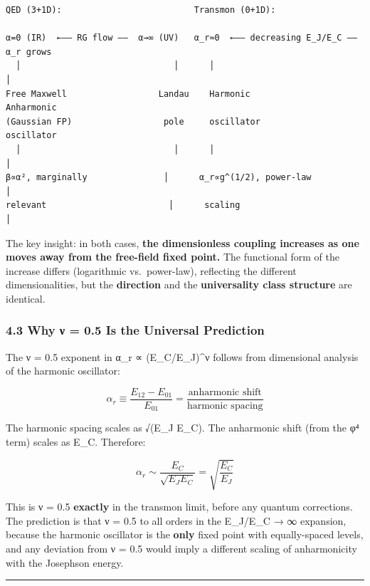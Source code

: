 \documentclass[
]{article}
\begin{document}
\begin{verbatim}
QED (3+1D):                          Transmon (0+1D):
                                     
α=0 (IR)  ←—— RG flow ——  α→∞ (UV)   α_r≈0  ←—— decreasing E_J/E_C ——  α_r grows
  │                              │      │                                    │
Free Maxwell                  Landau    Harmonic                        Anharmonic
(Gaussian FP)                  pole     oscillator                      oscillator
  │                              │      │                                    │
β∝α², marginally               │      α_r∝g^(1/2), power-law            │
relevant                        │      scaling                            │
\end{verbatim}

The key insight: in both cases, \textbf{the dimensionless coupling
increases as one moves away from the free-field fixed point.} The
functional form of the increase differs (logarithmic vs.~power-law),
reflecting the different dimensionalities, but the \textbf{direction}
and the \textbf{universality class structure} are identical.

\subsubsection{4.3 Why ν = 0.5 Is the Universal
Prediction}\label{why-ux3bd-0.5-is-the-universal-prediction}

The ν = 0.5 exponent in α\_r ∝ (E\_C/E\_J)\^{}ν follows from dimensional
analysis of the harmonic oscillator:

\[\alpha_r \equiv \frac{E_{12}-E_{01}}{E_{01}} = \frac{\text{anharmonic shift}}{\text{harmonic spacing}}\]

The harmonic spacing scales as √(E\_J E\_C). The anharmonic shift (from
the φ⁴ term) scales as E\_C. Therefore:

\[\alpha_r \sim \frac{E_C}{\sqrt{E_JE_C}} = \sqrt{\frac{E_C}{E_J}}\]

This is ν = 0.5 \textbf{exactly} in the transmon limit, before any
quantum corrections. The prediction is that ν = 0.5 to all orders in the
E\_J/E\_C → ∞ expansion, because the harmonic oscillator is the
\textbf{only} fixed point with equally-spaced levels, and any deviation
from ν = 0.5 would imply a different scaling of anharmonicity with the
Josephson energy.

\begin{center}\rule{0.5\linewidth}{0.5pt}\end{center}
\end{document}
